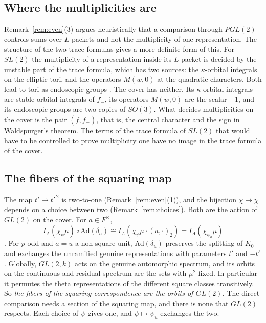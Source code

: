 \documentclass[12pt,letterpaper,openany]{book}
\theoremstyle{plain}
\theoremstyle{definition}
\theoremstyle{remark}
\theoremstyle{remark}
\begin{document}
\subsection*{Where the multiplicities are}

Remark~\ref{rem:even}(3) argues heuristically that a comparison through
$PGL(2)$ controls sums over $L$-packets and not the multiplicity of one
representation. The structure of the two trace formulas gives a more
definite form of this. For $SL(2)$ the multiplicity of a representation
inside its $L$-packet is decided by the unstable part of the trace
formula, which has two sources: the $\kappa$-orbital integrals on the
elliptic tori, and the operators $M(w,0)$ at the quadratic characters.
Both lead to tori as endoscopic groups \cite{LL}. The cover has neither.
Its $\kappa$-orbital integrals are stable orbital integrals of
$\overline f_-$, its operators $M(w,0)$ are the scalar $-1$, and its
endoscopic groups are two copies of $SO(3)$. What decides multiplicities
on the cover is the pair $(\overline f,\overline f_-)$, that is, the
central character and the sign in Waldspurger's theorem. The terms of
the trace formula of $SL(2)$ that would have to be controlled to prove
multiplicity one have no image in the trace formula of the cover.

\subsection*{The fibers of the squaring map}

The map $t'\mapsto t'^{\,2}$ is two-to-one (Remark~\ref{rem:even}(1)),
and the bijection $\chi\mapsto\overline\chi$ depends on a choice between
two (Remark~\ref{rem:choices}). Both are the action of $GL(2)$ on the
cover. For $a\in F^\times$,
\[
I_A(\chi_\psi\mu)\circ\mathrm{Ad}(\delta_a)\cong
I_A(\chi_\psi\mu\cdot(a,\cdot)_2)=I_A(\chi_{\psi_a}\mu)
\]
\cite[Proposition~8.9]{JC}. For $p$ odd and $a=u$ a non-square unit,
$\mathrm{Ad}(\delta_u)$ preserves the splitting of $K_0$ and exchanges the
unramified genuine representations with parameters $t'$ and $-t'$.
Globally, $GL(2,k)$ acts on the genuine automorphic spectrum, and its
orbits on the continuous and residual spectrum are the sets with
$\mu^2$ fixed. In particular it permutes the theta representations of the
different square classes transitively. So \emph{the fibers of the
squaring correspondence are the orbits of $GL(2)$.} The direct comparison
needs a section of the squaring map, and there is none that $GL(2)$
respects. Each choice of $\psi$ gives one, and $\psi\mapsto\psi_u$
exchanges the two.
\end{document}
